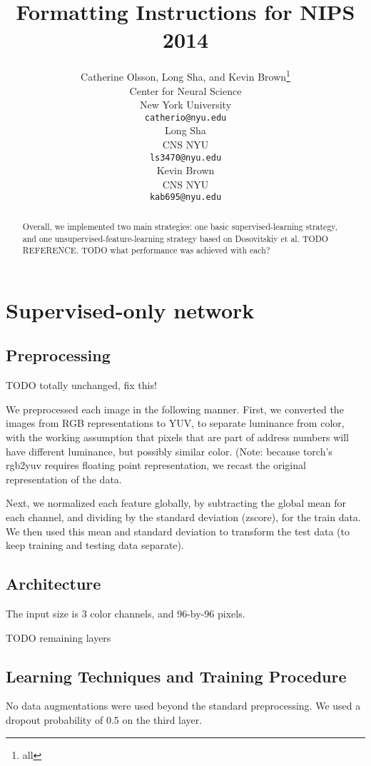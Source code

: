 \documentclass{article} %
\title{Formatting Instructions for NIPS 2014}
\author{
Catherine Olsson, Long Sha, and Kevin Brown\thanks{all} \\
Center for Neural Science\\
New York University\\
\texttt{catherio@nyu.edu} \\
\And
Long Sha \\
CNS NYU \\
\texttt{ls3470@nyu.edu} \\
\AND
Kevin Brown \\
CNS NYU \\
\texttt{kab695@nyu.edu} \\
}
\begin{document}
\maketitle

\begin{abstract}
Overall, we implemented two main strategies: one basic supervised-learning
strategy, and one unsupervised-feature-learning strategy based on Dosovitskiy
et al. TODO REFERENCE. TODO what performance was achieved with each?
\end{abstract}

\section{Supervised-only network}

\subsection{Preprocessing}

TODO totally unchanged, fix this!

We preprocessed each image in the following manner. First, we converted the
images from RGB representations to YUV, to separate luminance from color, with
the working assumption that pixels that are part of address numbers will have
different luminance, but possibly similar color. (Note: because torch's rgb2yuv
requires floating point representation, we recast the original representation of the data.

Next, we normalized each feature globally, by subtracting the global mean for
each channel, and dividing by the standard deviation (zscore), for the train
data. We then used this mean and standard deviation to transform the test data
(to keep training and testing data separate).



\subsection{Architecture}

The input size is 3 color channels, and 96-by-96 pixels. 

TODO remaining layers

\subsection{Learning Techniques and Training Procedure}
No data augmentations were used beyond the standard preprocessing. We used a dropout probability of 0.5 on the third layer.
\end{document}

